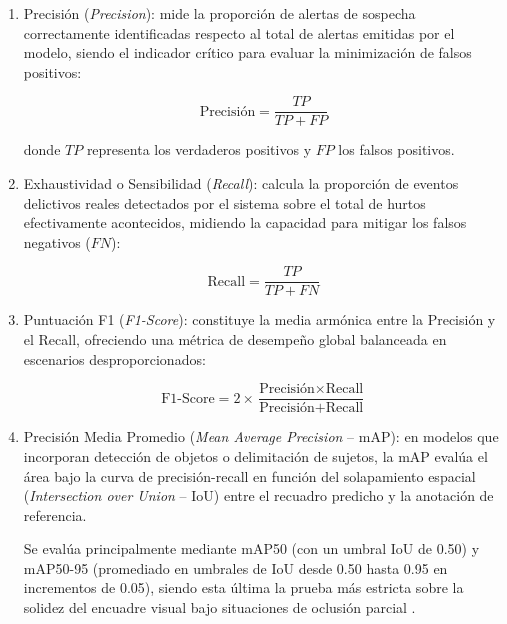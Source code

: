 \begin{enumerate}
    \item Precisión (\textit{Precision}): mide la proporción de alertas de sospecha correctamente identificadas respecto al total de alertas emitidas por el modelo, siendo el indicador crítico para evaluar la minimización de falsos positivos:

    \begin{equation}
        \text{Precisión} = \frac{TP}{TP + FP}
    \end{equation}

    donde $TP$ representa los verdaderos positivos y $FP$ los falsos positivos.

    \item Exhaustividad o Sensibilidad (\textit{Recall}): calcula la proporción de eventos delictivos reales detectados por el sistema sobre el total de hurtos efectivamente acontecidos, midiendo la capacidad para mitigar los falsos negativos ($FN$):

    \begin{equation}
        \text{Recall} = \frac{TP}{TP + FN}
    \end{equation}

    \item Puntuación F1 (\textit{F1-Score}): constituye la media armónica entre la Precisión y el Recall, ofreciendo una métrica de desempeño global balanceada en escenarios desproporcionados:

    \begin{equation}
        \text{F1-Score} =
        2 \times
        \frac{\text{Precisión} \times \text{Recall}}
        {\text{Precisión} + \text{Recall}}
    \end{equation}

    \item Precisión Media Promedio (\textit{Mean Average Precision} -- mAP): en modelos que incorporan detección de objetos o delimitación de sujetos, la mAP evalúa el área bajo la curva de precisión-recall en función del solapamiento espacial (\textit{Intersection over Union} -- IoU) entre el recuadro predicho y la anotación de referencia.

    Se evalúa principalmente mediante mAP50 (con un umbral IoU de 0.50) y mAP50-95 (promediado en umbrales de IoU desde 0.50 hasta 0.95 en incrementos de 0.05), siendo esta última la prueba más estricta sobre la solidez del encuadre visual bajo situaciones de oclusión parcial \cite{aguero_intelligent_2025}.
\end{enumerate}
